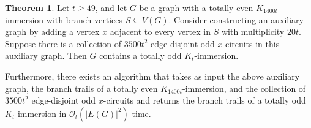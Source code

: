 \documentclass{article}
\theoremstyle{definition}
\newtheorem{theorem}[environment]{Theorem}
\begin{document}
\begin{theorem}\label{thm:makingImmersionOdd}
    Let $t \geq 49$, and let $G$ be a graph with a totally even $K_{1400t}$-immersion with branch vertices $S \subseteq V(G)$. Consider constructing an auxiliary graph by adding a vertex $x$ adjacent to every vertex in $S$ with multiplicity $20t$. Suppose there is a collection of $3500t^2$ edge-disjoint odd $x$-circuits in this auxiliary graph. Then $G$ contains a totally odd $K_t$-immersion.

    Furthermore, there exists an algorithm that takes as input the above auxiliary graph, the branch trails of a totally even $K_{1400t}$-immersion, and the collection of $3500t^2$ edge-disjoint odd $x$-circuits and returns the branch trails of a totally odd $K_t$-immersion in $\mathcal{O}_t(|E(G)|^2)$ time.
\end{theorem}
\end{document}

